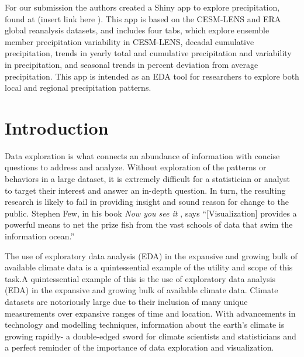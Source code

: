 \documentclass[10pt,letterpaper]{article}
\begin{document}
For our submission the authors created a Shiny app to explore precipitation, found at (insert link here ). This app is based on the CESM-LENS and ERA global reanalysis datasets, and includes four tabs, which explore ensemble member precipitation variability in CESM-LENS, decadal cumulative precipitation, trends in yearly total and cumulative precipitation and variability in precipitation, and seasonal trends in percent deviation from average precipitation. This app is intended as an EDA tool for researchers to explore both local and regional precipitation patterns.



\linenumbers

\section*{Introduction}

Data exploration is what connects an abundance of information with concise questions to address and analyze. Without exploration of the patterns or behaviors in a large dataset, it is extremely difficult for a statistician or analyst to target their interest and answer an in-depth question. In turn, the resulting research is likely to fail in providing insight and sound reason for change to the public. Stephen Few, in his book \textit{Now you see it} \cite{few_2009}, says “[Visualization] provides a powerful means to net the prize fish from the vast schools of data that swim the information ocean.”

The use of exploratory data analysis (EDA) in the expansive and growing bulk of available climate data is a quintessential example of the utility and scope of this task.A quintessential example of this is the use of exploratory data analysis (EDA) in the expansive and growing bulk of available climate data. Climate datasets are notoriously large due to their inclusion of many unique measurements over expansive ranges of time and location. With advancements in technology and modelling techniques, information about the earth’s climate is growing rapidly- a double-edged sword for climate scientists and statisticians and a perfect reminder of the importance of data exploration and visualization.
\end{document}
